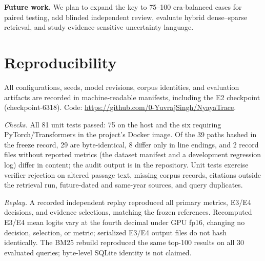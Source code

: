 \documentclass[conference]{IEEEtran}
\begin{document}
\textbf{Future work.} We plan to expand the key to 75--100 era-balanced cases for paired testing, add blinded independent review, evaluate hybrid dense--sparse retrieval, and study evidence-sensitive uncertainty language.

\section*{Reproducibility}
All configurations, seeds, model revisions, corpus identities, and evaluation artifacts are recorded in machine-readable manifests, including the E2 checkpoint (checkpoint-6318). Code: \url{https://github.com/0-YuvrajSingh/NyayaTrace}.

\textit{Checks.} All 81 unit tests passed: 75 on the host and the six requiring PyTorch/Transformers in the project's Docker image. Of the 39 paths hashed in the freeze record, 29 are byte-identical, 8 differ only in line endings, and 2 record files without reported metrics (the dataset manifest and a development regression log) differ in content; the audit output is in the repository. Unit tests exercise verifier rejection on altered passage text, missing corpus records, citations outside the retrieval run, future-dated and same-year sources, and query duplicates.

\textit{Replay.} A recorded independent replay reproduced all primary metrics, E3/E4 decisions, and evidence selections, matching the frozen references. Recomputed E3/E4 mean logits vary at the fourth decimal under GPU fp16, changing no decision, selection, or metric; serialized E3/E4 output files do not hash identically. The BM25 rebuild reproduced the same top-100 results on all 30 evaluated queries; byte-level SQLite identity is not claimed.
\end{document}
